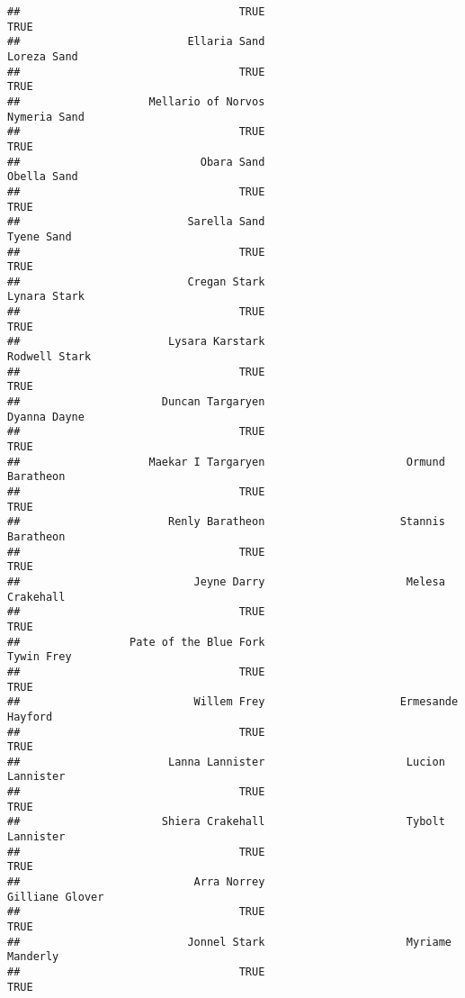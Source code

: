 \documentclass[
]{book}
\begin{document}
\begin{verbatim}
##                                  TRUE                                  TRUE 
##                          Ellaria Sand                           Loreza Sand 
##                                  TRUE                                  TRUE 
##                    Mellario of Norvos                          Nymeria Sand 
##                                  TRUE                                  TRUE 
##                            Obara Sand                           Obella Sand 
##                                  TRUE                                  TRUE 
##                          Sarella Sand                            Tyene Sand 
##                                  TRUE                                  TRUE 
##                          Cregan Stark                          Lynara Stark 
##                                  TRUE                                  TRUE 
##                       Lysara Karstark                         Rodwell Stark 
##                                  TRUE                                  TRUE 
##                      Duncan Targaryen                          Dyanna Dayne 
##                                  TRUE                                  TRUE 
##                    Maekar I Targaryen                      Ormund Baratheon 
##                                  TRUE                                  TRUE 
##                       Renly Baratheon                     Stannis Baratheon 
##                                  TRUE                                  TRUE 
##                           Jeyne Darry                      Melesa Crakehall 
##                                  TRUE                                  TRUE 
##                 Pate of the Blue Fork                            Tywin Frey 
##                                  TRUE                                  TRUE 
##                           Willem Frey                     Ermesande Hayford 
##                                  TRUE                                  TRUE 
##                       Lanna Lannister                      Lucion Lannister 
##                                  TRUE                                  TRUE 
##                      Shiera Crakehall                      Tybolt Lannister 
##                                  TRUE                                  TRUE 
##                           Arra Norrey                       Gilliane Glover 
##                                  TRUE                                  TRUE 
##                          Jonnel Stark                      Myriame Manderly 
##                                  TRUE                                  TRUE 

\end{verbatim}
\end{document}
